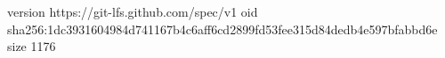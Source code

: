 version https://git-lfs.github.com/spec/v1
oid sha256:1dc3931604984d741167b4c6aff6cd2899fd53fee315d84dedb4e597bfabbd6e
size 1176
